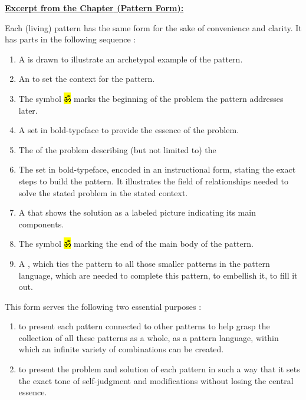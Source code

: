 \vspace{20mm}

\underline{\textbf{\textcolor{BurntOrange}{Excerpt from the Chapter} \textcolor{Sepia}{(Pattern Form):}}}

\hspace{5mm}Each (living) pattern has the same form for the sake of convenience and clarity. It has  parts in the following sequence :
\begin{enumerate}[label=\protect\circnode{\color{Sepia}\arabic*}]
\item A  is drawn to illustrate an archetypal example of the pattern.
\item An  to set the context for the pattern.
\item The symbol \hl{\texthindi{ॐ}} marks the beginning of the problem the pattern addresses later.
\item A  set in bold-typeface to provide the essence of the problem.
\item The  of the problem describing (but not limited to) the 
\item The  set in bold-typeface, encoded in an instructional form, stating the exact steps to build the pattern. It illustrates the field of relationships needed to solve the stated problem in the stated context.
\item A  that shows the solution as a labeled picture indicating its main components.
\item The symbol \hl{\texthindi{ॐ}} marking the end of the main body of the pattern.
\item A , which ties the pattern to all those smaller patterns in the pattern language, which are needed to complete this pattern, to embellish it, to fill it out.
\end{enumerate}

This form serves the following two essential purposes :
\begin{enumerate}[itemsep=0.3em]%
    \item to present each pattern connected to other patterns to help grasp the collection of all these patterns as a whole, as a pattern language, within which an infinite variety of combinations can be created.
    \item to present the problem and solution of each pattern in such a way that it sets the exact tone of self-judgment and modifications without losing the central essence. 
\end{enumerate}

